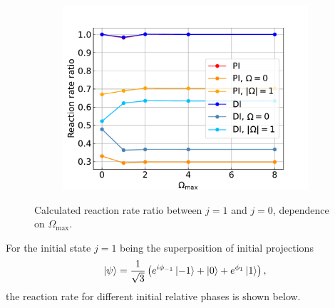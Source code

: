 \documentclass{article}
\begin{document}
    \begin{figure}[H]
        \centering
        \begin{subfigure}{.7\linewidth}
            \centering
            \includegraphics[width=\linewidth]{coriolis_rr_omega_maxes_ratio.pdf}
        \end{subfigure} 
        \caption{Calculated reaction rate ratio between $j = 1$ and $j = 0$, dependence on $\Omega_\text{max}$.}
    \end{figure}

    For the initial state $j = 1$ being the superposition of initial projections
    \begin{equation}
        \ket{\psi} = \frac{1}{\sqrt{3}} \left(e^{i\phi_{-1}}\ket{-1} + \ket{0} + e^{\phi_1}\ket{1}\right),
    \end{equation} 
    the reaction rate for different initial relative phases is shown below.
\end{document}
